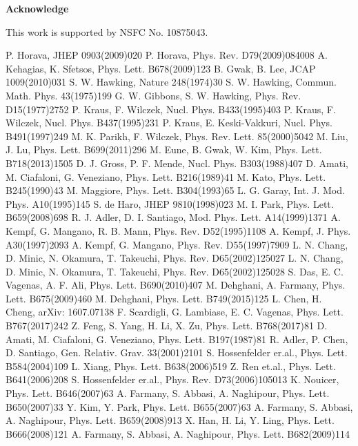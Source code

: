 \documentclass[graphicx, 12pt]{article}
\begin{document}
\vspace{1cm}
\noindent \textbf{Acknowledge}

This work is supported by NSFC No. 10875043.

\newpage
\begin{thebibliography}{99}
P. Horava, JHEP 0903(2009)020
P. Horava, Phys. Rev. D79(2009)084008
A. Kehagias, K. Sfetsos, Phys. Lett.
B678(2009)123
B. Gwak, B. Lee, JCAP 1009(2010)031
S. W. Hawking, Nature 248(1974)30
S. W. Hawking, Commun. Math. Phys. 43(1975)199
G. W. Gibbons, S. W. Hawking, Phys. Rev.
D15(1977)2752
P. Kraus, F. Wilczek, Nucl. Phys. B433(1995)403
P. Kraus, F. Wilczek, Nucl. Phys. B437(1995)231
P. Kraus, E. Keski-Vakkuri, Nucl. Phys.
B491(1997)249
M. K. Parikh, F. Wilczek, Phys. Rev. Lett. 85(2000)5042
M. Liu, J. Lu, Phys. Lett. B699(2011)296
M. Eune, B. Gwak, W. Kim, Phys. Lett. B718(2013)1505
D. J. Gross, P. F. Mende, Nucl. Phys. B303(1988)407
D. Amati, M. Ciafaloni, G. Veneziano, Phys. Lett.
B216(1989)41
M. Kato, Phys. Lett. B245(1990)43
M. Maggiore, Phys. Lett. B304(1993)65
L. G. Garay, Int. J. Mod. Phys. A10(1995)145
S. de Haro, JHEP 9810(1998)023
M. I. Park, Phys. Lett. B659(2008)698
R. J. Adler, D. I. Santiago, Mod. Phys. Lett.
A14(1999)1371
A. Kempf, G. Mangano, R. B. Mann, Phys. Rev.
D52(1995)1108
A. Kempf, J. Phys. A30(1997)2093
A. Kempf, G. Mangano, Phys. Rev. D55(1997)7909
L. N. Chang, D. Minic, N. Okamura, T. Takeuchi,
Phys. Rev. D65(2002)125027
L. N. Chang, D. Minic, N. Okamura, T. Takeuchi,
Phys. Rev. D65(2002)125028
S. Das, E. C. Vagenas, A. F. Ali, Phys. Lett.
B690(2010)407
M. Dehghani, A. Farmany, Phys. Lett.
B675(2009)460
M. Dehghani, Phys. Lett. B749(2015)125
L. Chen, H. Cheng, arXiv: 1607.07138
F. Scardigli, G. Lambiase, E. C. Vagenas, Phys.
Lett. B767(2017)242
Z. Feng, S. Yang, H. Li, X. Zu, Phys. Lett.
B768(2017)81
D. Amati, M. Ciafaloni, G. Veneziano, Phys. Lett.
B197(1987)81
R. Adler, P. Chen, D. Santiago, Gen. Relativ. Grav.
33(2001)2101
S. Hossenfelder er.al., Phys. Lett.
B584(2004)109
L. Xiang, Phys. Lett. B638(2006)519
Z. Ren et.al., Phys. Lett. B641(2006)208
S. Hossenfelder er.al., Phys. Rev.
D73(2006)105013
K. Nouicer, Phys. Lett. B646(2007)63
A. Farmany, S. Abbasi, A. Naghipour, Phys. Lett.
B650(2007)33
Y. Kim, Y. Park, Phys. Lett. B655(2007)63
A. Farmany, S. Abbasi, A. Naghipour, Phys. Lett.
B659(2008)913
X. Han, H. Li, Y. Ling, Phys. Lett. B666(2008)121
A. Farmany, S. Abbasi, A. Naghipour, Phys. Lett.
B682(2009)114

\end{thebibliography}
\end{document}
